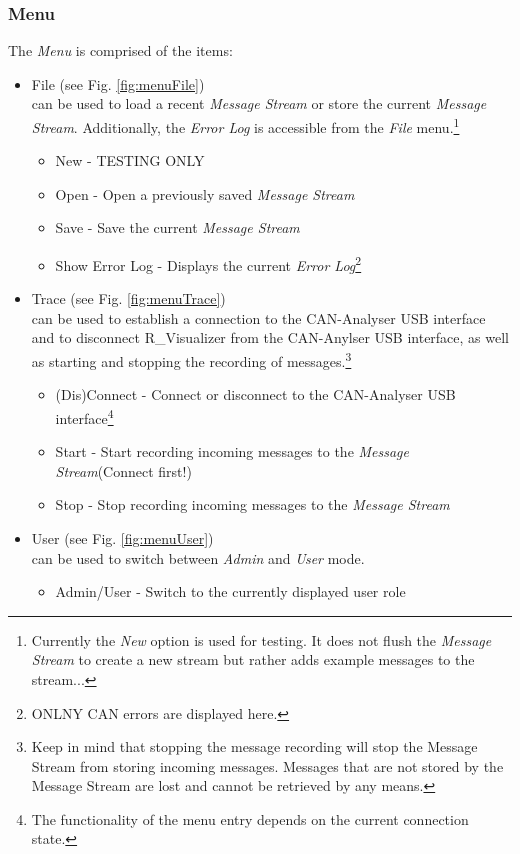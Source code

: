 \documentclass[12pt,a4paper]{scrartcl}
\begin{document}
\subsubsection{Menu}
\label{subsubsec:GettingStartedOverviewMenu}
The \textit{Menu} is comprised of the items: 

\begin{itemize}
\item File (see Fig. \ref{fig:menuFile})\\
can be used to load a recent \textit{Message Stream} or store the current \textit{Message Stream}. Additionally, the \textit{Error Log} is accessible from the \textit{File} menu.\footnote{Currently the \textit{New} option is used for testing. It does not flush the \textit{Message Stream} to create a new stream but rather adds example messages to the stream...}
\begin{itemize}
	\item New - TESTING ONLY
	\item Open - Open a previously saved \textit{Message Stream}
	\item Save - Save the current \textit{Message Stream}
	\item Show Error Log - Displays the current \textit{Error Log}\footnote{ONLNY CAN errors are displayed here.}
\end{itemize}
\item Trace (see Fig. \ref{fig:menuTrace})\\
can be used to establish a connection to the CAN-Analyser USB interface and to disconnect R\_Visualizer from the CAN-Anylser USB interface, as well as starting and stopping the recording of messages.\footnote{Keep in mind that stopping the message recording will stop the Message Stream from storing incoming messages. Messages that are not stored by the Message Stream are lost and cannot be retrieved by any means.}
\begin{itemize}
	\item (Dis)Connect - Connect or disconnect to the CAN-Analyser USB interface\footnote{The functionality of the menu entry depends on the current connection state.}
	\item Start - Start recording incoming messages to the \textit{Message Stream}(Connect first!)
	\item Stop - Stop recording incoming messages to the \textit{Message Stream}
\end{itemize}
\item User (see Fig. \ref{fig:menuUser})\\
can be used to switch between \textit{Admin} and \textit{User} mode.
\begin{itemize}
	\item Admin/User - Switch to the currently displayed user role
\end{itemize}
\end{itemize}
\end{document}
